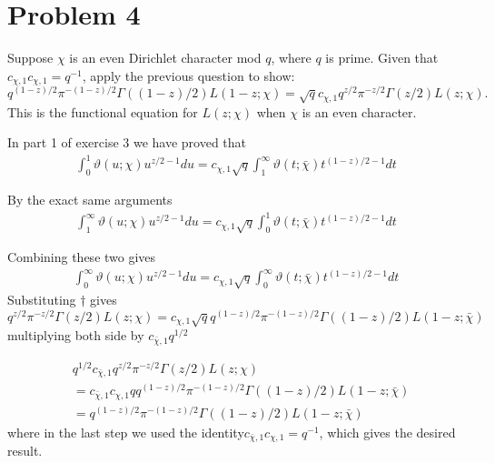 \documentclass{article}
\theoremstyle{definition}
\theoremstyle{definition}
\theoremstyle{remark}
\begin{document}
\newpage

\section*{Problem 4}
Suppose $\chi$ is an even Dirichlet character mod $q$, where $q$ is prime. Given that $c_{\chi,1}c_{\chi,1} = q^{-1}$, apply the previous question to show:
\begin{equation*}
    q^{(1-z)/2}\pi^{-(1-z)/2}\Gamma((1-z)/2)L(1-z;\chi) = \sqrt{q} c_{\chi,1} q^{z/2}\pi^{-z/2}\Gamma(z/2)L(z;\chi).
\end{equation*}
This is the functional equation for $L(z;\chi)$ when $\chi$ is an even character.

In part 1 of exercise 3 we have proved that 
\begin{align}
	\int_0^1 \vartheta(u;\chi) u^{z/2-1} du =  c_{\chi,1} \sqrt{q} \int^{\infty}_{1} \vartheta(t;\bar{\chi})t^{(1-z)/2 - 1} dt
\end{align}

By the exact same arguments
\begin{align}
	\int_1^{\infty} \vartheta(u;\chi) u^{z/2-1} du =  c_{\chi,1} \sqrt{q} \int^{1}_{0} \vartheta(t;\bar{\chi})t^{(1-z)/2 - 1} dt
\end{align}

Combining these two gives
\begin{align}
	\int_0^{\infty} \vartheta(u;\chi) u^{z/2-1} du =  c_{\chi,1} \sqrt{q} \int_{0}^{\infty} \vartheta(t;\bar{\chi})t^{(1-z)/2 - 1} dt
\end{align}
Substituting $\dagger$ gives 
$$
q^{z/2}\pi^{-z/2}\Gamma(z/2)L(z;\chi) = c_{\chi,1} \sqrt{q} q^{(1-z)/2}\pi^{-(1-z)/2}\Gamma((1-z)/2)L(1-z;\bar{\chi}) 
$$
multiplying both side by $c_{\bar{\chi}, 1}q^{1/2}$

\begin{align}
 &q^{1/2} c_{\bar{\chi}, 1} q^{z/2}\pi^{-z/2}\Gamma(z/2)L(z;\chi) 
 \\
 &=  c_{\bar{\chi}, 1} c_{\chi,1} q q^{(1-z)/2}\pi^{-(1-z)/2}\Gamma((1-z)/2)L(1-z;\bar{\chi}) \\ 
 &= q^{(1-z)/2}\pi^{-(1-z)/2}\Gamma((1-z)/2)L(1-z;\bar{\chi})
\end{align}
where in the last step we used the identity$c_{\bar{\chi}, 1}c_{\chi, 1} = q^{-1}$, which gives the desired result.
\end{document}
